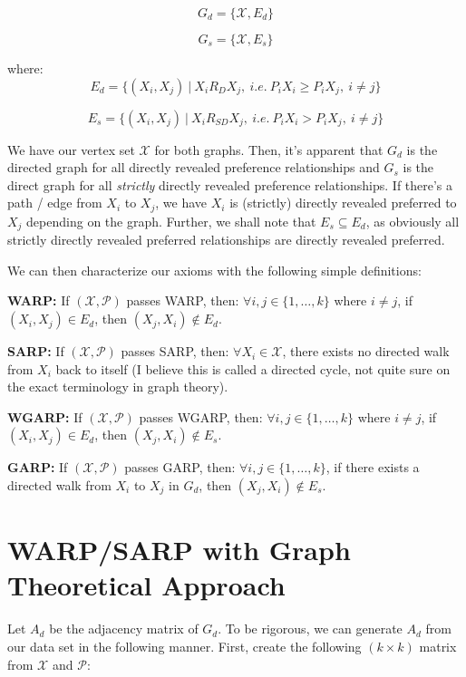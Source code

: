 \documentclass{article} %
\begin{document}
\begin{minipage}{.5\linewidth}
$$G_d=\{\mathcal{X},E_d\}$$
\end{minipage}%
\begin{minipage}{.5\linewidth}
$$G_s=\{\mathcal{X},E_s\}$$
\end{minipage}


where:
$$E_d=\{(X_i,X_j)\ |\ X_i R_D X_j,\ i.e.\ P_iX_i\geq P_iX_j,\ i\not=j\}$$

$$E_s=\{(X_i,X_j)\ |\ X_i R_{SD} X_j,\ i.e.\ P_iX_i> P_iX_j,\ i\not=j\}$$

We have our vertex set $\mathcal{X}$ for both graphs. Then, it's apparent that $G_d$ is the directed graph for all directly revealed preference relationships and $G_s$ is the direct graph for all \textit{strictly} directly revealed preference relationships. If there's a path / edge from $X_i$ to $X_j$, we have $X_i$ is (strictly) directly revealed preferred to $X_j$ depending on the graph. Further, we shall note that $E_s\subseteq E_d$, as obviously all strictly directly revealed preferred relationships are directly revealed preferred.


We can then characterize our axioms with the following simple definitions:


\textbf{WARP:} If $(\mathcal{X},\mathcal{P})$ passes WARP, then: $\forall i,j\in\{1,\dots,k\}$ where $i\not=j$, if $(X_i,X_j)\in E_d$, then $(X_j, X_i)\not\in E_d$.


\textbf{SARP:} If $(\mathcal{X},\mathcal{P})$ passes SARP, then: $\forall X_i \in \mathcal{X}$, there exists no directed walk from $X_i$ back to itself (I believe this is called a directed cycle, not quite sure on the exact terminology in graph theory).


\textbf{WGARP:} If $(\mathcal{X},\mathcal{P})$ passes WGARP, then: $\forall i,j\in\{1,\dots,k\}$ where $i\not=j$, if $(X_i,X_j)\in E_d$, then $(X_j, X_i)\not\in E_s$.


\textbf{GARP:} If $(\mathcal{X},\mathcal{P})$ passes GARP, then: $\forall i,j\in\{1,\dots,k\}$, if there exists a directed walk from $X_i$ to $X_j$ in $G_d$, then $(X_j,X_i)\not\in E_s$.


\section{WARP/SARP with Graph Theoretical Approach}

Let $A_d$ be the adjacency matrix of $G_d$. To be rigorous, we can generate $A_d$ from our data set in the following manner. First, create the following $(k\times k)$ matrix from $\mathcal{X}$ and $\mathcal{P}$:
\end{document}
